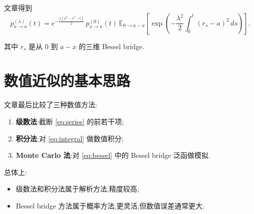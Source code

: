 \documentclass[oneside]{ctexart}
\begin{document}
文章得到
\begin{equation}\label{eq:bessel}
    p_{x\to a}^{(\lambda)}(t)
    =
    e^{-\tfrac{\lambda(a^2-x^2-t)}{2}}
    \,p_{x\to a}^{(0)}(t)\,
    \mathbb{E}_{0\to a-x}
    \left[
        \exp\left(
        -\frac{\lambda^2}{2}\int_0^t (r_s-a)^2\,ds
        \right)
        \right].
\end{equation}

其中 $r_s$ 是从 $0$ 到 $a-x$ 的三维 Bessel bridge.


\section{数值近似的基本思路}

文章最后比较了三种数值方法:

\begin{enumerate}[(1)]
    \item \textbf{级数法}:截断 \eqref{eq:series} 的前若干项;
    \item \textbf{积分法}:对 \eqref{eq:integral} 做数值积分;
    \item \textbf{Monte Carlo 法}:对 \eqref{eq:bessel} 中的 Bessel bridge 泛函做模拟.
\end{enumerate}

总体上:

\begin{itemize}
    \item 级数法和积分法属于解析方法,精度较高;
    \item Bessel bridge 方法属于概率方法,更灵活,但数值误差通常更大.
\end{itemize}
\end{document}
